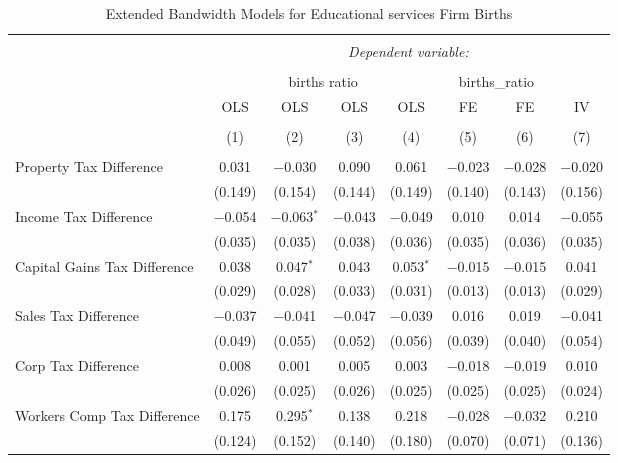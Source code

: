 
\begin{table}[!htbp] \centering 
  \caption{Extended Bandwidth Models for  Educational services Firm Births} 
  \label{} 
\begin{tabular}{@{\extracolsep{5pt}}lccccccc} 
\\[-1.8ex]\hline 
\hline \\[-1.8ex] 
 & \multicolumn{7}{c}{\textit{Dependent variable:}} \\ 
\cline{2-8} 
\\[-1.8ex] & \multicolumn{4}{c}{births ratio} & \multicolumn{2}{c}{births\_ratio} &   \\ 
 & OLS & OLS & OLS & OLS & FE & FE & IV \\ 
\\[-1.8ex] & (1) & (2) & (3) & (4) & (5) & (6) & (7)\\ 
\hline \\[-1.8ex] 
 Property Tax Difference & 0.031 & $-$0.030 & 0.090 & 0.061 & $-$0.023 & $-$0.028 & $-$0.020 \\ 
  & (0.149) & (0.154) & (0.144) & (0.149) & (0.140) & (0.143) & (0.156) \\ 
  Income Tax Difference & $-$0.054 & $-$0.063$^{*}$ & $-$0.043 & $-$0.049 & 0.010 & 0.014 & $-$0.055 \\ 
  & (0.035) & (0.035) & (0.038) & (0.036) & (0.035) & (0.036) & (0.035) \\ 
  Capital Gains Tax Difference & 0.038 & 0.047$^{*}$ & 0.043 & 0.053$^{*}$ & $-$0.015 & $-$0.015 & 0.041 \\ 
  & (0.029) & (0.028) & (0.033) & (0.031) & (0.013) & (0.013) & (0.029) \\ 
  Sales Tax Difference & $-$0.037 & $-$0.041 & $-$0.047 & $-$0.039 & 0.016 & 0.019 & $-$0.041 \\ 
  & (0.049) & (0.055) & (0.052) & (0.056) & (0.039) & (0.040) & (0.054) \\ 
  Corp Tax Difference & 0.008 & 0.001 & 0.005 & 0.003 & $-$0.018 & $-$0.019 & 0.010 \\ 
  & (0.026) & (0.025) & (0.026) & (0.025) & (0.025) & (0.025) & (0.024) \\ 
  Workers Comp Tax Difference & 0.175 & 0.295$^{*}$ & 0.138 & 0.218 & $-$0.028 & $-$0.032 & 0.210 \\ 
  & (0.124) & (0.152) & (0.140) & (0.180) & (0.070) & (0.071) & (0.136) \\ 

\end{tabular}
\end{table}

